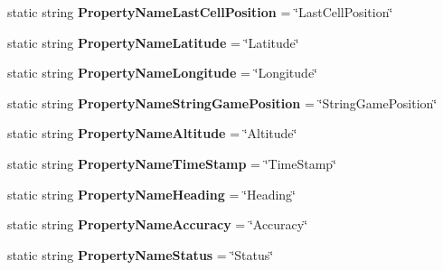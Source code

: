 \begin{DoxyCompactItemize}
\item 
\hypertarget{classClient_1_1Common_1_1Models_1_1Geolocation_a38d84853f94027baa3c60adc8f02d6e3}{static string {\bfseries Property\-Name\-Last\-Cell\-Position} = \char`\"{}Last\-Cell\-Position\char`\"{}}\label{classClient_1_1Common_1_1Models_1_1Geolocation_a38d84853f94027baa3c60adc8f02d6e3}

\item 
\hypertarget{classClient_1_1Common_1_1Models_1_1Geolocation_a8a401890e424cd054d2e325e1dc01f8e}{static string {\bfseries Property\-Name\-Latitude} = \char`\"{}Latitude\char`\"{}}\label{classClient_1_1Common_1_1Models_1_1Geolocation_a8a401890e424cd054d2e325e1dc01f8e}

\item 
\hypertarget{classClient_1_1Common_1_1Models_1_1Geolocation_a594d0a04417db0077fe86441242360d3}{static string {\bfseries Property\-Name\-Longitude} = \char`\"{}Longitude\char`\"{}}\label{classClient_1_1Common_1_1Models_1_1Geolocation_a594d0a04417db0077fe86441242360d3}

\item 
\hypertarget{classClient_1_1Common_1_1Models_1_1Geolocation_a4bf4647ed209c7eb632edddda3d8b729}{static string {\bfseries Property\-Name\-String\-Game\-Position} = \char`\"{}String\-Game\-Position\char`\"{}}\label{classClient_1_1Common_1_1Models_1_1Geolocation_a4bf4647ed209c7eb632edddda3d8b729}

\item 
\hypertarget{classClient_1_1Common_1_1Models_1_1Geolocation_a3316a606ae6b12d6f04329fd1e4ace9a}{static string {\bfseries Property\-Name\-Altitude} = \char`\"{}Altitude\char`\"{}}\label{classClient_1_1Common_1_1Models_1_1Geolocation_a3316a606ae6b12d6f04329fd1e4ace9a}

\item 
\hypertarget{classClient_1_1Common_1_1Models_1_1Geolocation_a6833e8a264e1e993617e1711c00e1879}{static string {\bfseries Property\-Name\-Time\-Stamp} = \char`\"{}Time\-Stamp\char`\"{}}\label{classClient_1_1Common_1_1Models_1_1Geolocation_a6833e8a264e1e993617e1711c00e1879}

\item 
\hypertarget{classClient_1_1Common_1_1Models_1_1Geolocation_a55d811ef3d1bd3c993ec063acc79e144}{static string {\bfseries Property\-Name\-Heading} = \char`\"{}Heading\char`\"{}}\label{classClient_1_1Common_1_1Models_1_1Geolocation_a55d811ef3d1bd3c993ec063acc79e144}

\item 
\hypertarget{classClient_1_1Common_1_1Models_1_1Geolocation_adc17f7517c4212746606e8545037d657}{static string {\bfseries Property\-Name\-Accuracy} = \char`\"{}Accuracy\char`\"{}}\label{classClient_1_1Common_1_1Models_1_1Geolocation_adc17f7517c4212746606e8545037d657}

\item 
\hypertarget{classClient_1_1Common_1_1Models_1_1Geolocation_aefd68c35a83db96e6a53d95f081f906f}{static string {\bfseries Property\-Name\-Status} = \char`\"{}Status\char`\"{}}\label{classClient_1_1Common_1_1Models_1_1Geolocation_aefd68c35a83db96e6a53d95f081f906f}

\end{DoxyCompactItemize}

